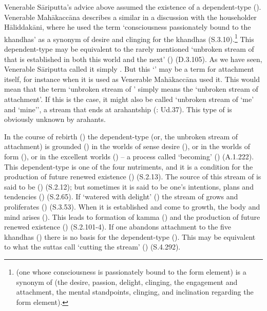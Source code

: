 Venerable Sāriputta's advice above assumed the existence of a dependent-type  (). Venerable Mahākaccāna describes a similar  in a discussion with the householder Hāliddakāni, where he used the term `consciousness passionately bound to the khandhas' as a synonym of desire and clinging for the khandhas (S.3.10).\footnote{ (one whose consciousness is passionately bound to the form element) is a synonym of  (the desire, passion, delight, clinging, the engagement and attachment, the mental standpoints, clinging, and inclination regarding the form element).} This dependent-type  may be equivalent to the rarely mentioned `unbroken stream of  that is established in both this world and the next' () (D.3.105). As we have seen, Venerable Sāriputta called it simply . But this `' may be a term for attachment itself, for instance when it is used as Venerable Mahākaccāna used it. This would mean that the term `unbroken stream of ' simply means the `unbroken stream of attachment'. If this is the case, it might also be called `unbroken stream of `me' and `mine'', a stream that ends at arahantship (: Ud.37). This type of  is obviously unknown by arahants. 

In the course of rebirth () the dependent-type  (or, the unbroken stream of attachment) is grounded () in the worlds of sense desire (), or in the worlds of form (), or in the excellent worlds () -- a process called `becoming' () (A.1.222). This dependent-type  is one of the four nutriments, and it is a condition for the production of future renewed existence () (S.2.13). The source of this stream of  is said to be  () (S.2.12); but sometimes it is said to be one's intentions, plans and tendencies () (S.2.65). If `watered with delight' () the stream of  grows and proliferates () (S.3.53). When it is established and come to growth, the body and mind arises (). This leads to formation of kamma () and the production of future renewed existence () (S.2.101-4). If one abandons attachment to the five khandhas () there is no basis for the dependent-type  (). This may be equivalent to what the suttas call `cutting the stream' () (S.4.292).

